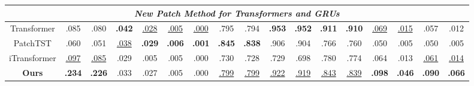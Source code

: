 \begin{table}[t]
{\begin{tabular}{@{} p{0.9cm} p{0.55cm} p{0.55cm} p{0.55cm} p{0.55cm} p{0.55cm} p{0.55cm} p{0.55cm} p{0.55cm} p{0.55cm} p{0.55cm} p{0.55cm} p{0.55cm} p{0.55cm} p{0.52cm} p{0.52cm} p{0.52cm} p{0.52cm} @{}}
\multicolumn{18}{c}{\textbf{\textit{New Patch Method for Transformers and GRUs}}} \\ 
\midrule
\multicolumn{2}{c}{Transformer}      
  & \multicolumn{1}{c}{.085} 
  & \multicolumn{1}{c}{.080} 
  & \multicolumn{1}{c}{{\textbf{.042}}} 
  & \multicolumn{1}{c}{{\underline{.028}}} 
  & \multicolumn{1}{c}{{\underline{.005}}} 
  & \multicolumn{1}{c}{{\underline{.000}}} 
  & \multicolumn{1}{c}{.795} 
  & \multicolumn{1}{c}{.794} 
  & \multicolumn{1}{c}{{\textbf{.953}}} 
  & \multicolumn{1}{c}{{\textbf{.952}}} 
  & \multicolumn{1}{c}{{\textbf{.911}}} 
  & \multicolumn{1}{c}{{\textbf{.910}}} 
  & \multicolumn{1}{c}{{\underline{.069}}} 
  & \multicolumn{1}{c}{{\underline{.015}}} 
  & \multicolumn{1}{c}{.057} 
  & \multicolumn{1}{c}{.012} \\ 

\multicolumn{2}{c}{PatchTST}     
  & \multicolumn{1}{c}{.060} 
  & \multicolumn{1}{c}{.051} 
  & \multicolumn{1}{c}{{\underline{.038}}} 
  & \multicolumn{1}{c}{{\textbf{.029}}} 
  & \multicolumn{1}{c}{{\textbf{.006}}} 
  & \multicolumn{1}{c}{{\textbf{.001}}} 
  & \multicolumn{1}{c}{{\textbf{.845}}} 
  & \multicolumn{1}{c}{{\textbf{.838}}} 
  & \multicolumn{1}{c}{.906} 
  & \multicolumn{1}{c}{.904} 
  & \multicolumn{1}{c}{.766} 
  & \multicolumn{1}{c}{.760} 
  & \multicolumn{1}{c}{.050} 
  & \multicolumn{1}{c}{.005} 
  & \multicolumn{1}{c}{.050} 
  & \multicolumn{1}{c}{.005} \\ 

\multicolumn{2}{c}{iTransformer} 
  & \multicolumn{1}{c}{{\underline{.097}}} 
  & \multicolumn{1}{c}{{\underline{.085}}} 
  & \multicolumn{1}{c}{.029} 
  & \multicolumn{1}{c}{.005} 
  & \multicolumn{1}{c}{.005} 
  & \multicolumn{1}{c}{.000} 
  & \multicolumn{1}{c}{.730} 
  & \multicolumn{1}{c}{.728} 
  & \multicolumn{1}{c}{.729} 
  & \multicolumn{1}{c}{.698} 
  & \multicolumn{1}{c}{.780} 
  & \multicolumn{1}{c}{.774} 
  & \multicolumn{1}{c}{.064} 
  & \multicolumn{1}{c}{.013} 
  & \multicolumn{1}{c}{{\underline{.061}}} 
  & \multicolumn{1}{c}{{\underline{.014}}} \\ 

\multicolumn{2}{c}{\textbf{Ours}}         
  & \multicolumn{1}{c}{{\textbf{.234}}} 
  & \multicolumn{1}{c}{{\textbf{.226}}} 
  & \multicolumn{1}{c}{.033} 
  & \multicolumn{1}{c}{.027} 
  & \multicolumn{1}{c}{.005} 
  & \multicolumn{1}{c}{.000} 
  & \multicolumn{1}{c}{{\underline{.799}}} 
  & \multicolumn{1}{c}{{\underline{.799}}}
  & \multicolumn{1}{c}{{\underline{.922}}} 
  & \multicolumn{1}{c}{{\underline{.919}}} 
  & \multicolumn{1}{c}{{\underline{.843}}} 
  & \multicolumn{1}{c}{{\underline{.839}}} 
  & \multicolumn{1}{c}{{\textbf{.098}}} 
  & \multicolumn{1}{c}{{\textbf{.046}}} 
  & \multicolumn{1}{c}{{\textbf{.090}}} 
  & \multicolumn{1}{c}{{\textbf{.066}}} \\ 
\midrule



\end{tabular}}
\end{table}
